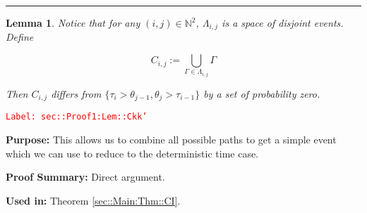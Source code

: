 \documentclass[12pt]{article}
\newcommand{\mb}{\mathbb}
\newcommand{\tr}{\textcolor{red}}
\newcommand{\labe}[1]{\tr{\texttt{Label: #1}}}
\newcommand{\purpose}{\textbf{Purpose: }}
\newcommand{\pfsum}{\textbf{Proof Summary: }}
\newcommand{\usein}{\textbf{Used in: }}
\newcommand{\lin}{\rule{\linewidth}{0.4 pt}}
\newcommand{\indx}[1]{_{#1}}					%
\newcommand{\rt}{\tau}							%
\newcommand{\rtt}{\theta}						%
\newcommand{\apath}{\Gamma}						%
\newcommand{\pathset}[2]{\Lambda_{#1,#2}}		%
\newcommand{\pathsete}[2]{C_{#1,#2}}			%
\newtheorem{lem}[thms]{Lemma}
\begin{document}
\lin

\begin{lem}
Notice that for any \((i,j) \in \mb{N}^2\), \(\pathset{i}{j}\) is a space of disjoint events. Define

\[\pathsete{i}{j} := \bigcup_{\apath\in\pathset{i}{j}} \apath\]

Then \(\pathsete{i}{j}\) differs from \(\{\rt\indx{i} > \rtt\indx{j-1}, \rtt\indx{j} > \rt\indx{i-1}\}\) by a set of probability zero.
\label{sec::Proof1:Lem::Ckk'}
\end{lem}
\labe{sec::Proof1:Lem::Ckk'}

\purpose This allows us to combine all possible paths to get a simple event which we can use to reduce to the deterministic time case.

\pfsum Direct argument.

\usein Theorem \ref{sec::Main:Thm::CI}.
\end{document}
